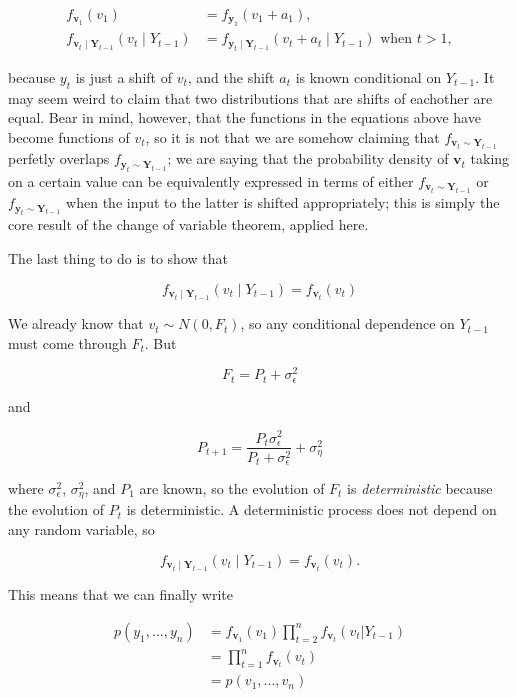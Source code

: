 \documentclass{tufte-book}
\begin{document}
\begin{align*}
f_{\bm{v}_1}(v_1) &= f_{\bm{y}_1} (v_1 + a_1),  \\
f_{\bm{v}_t \mid \bm{Y}_{t-1}}(v_t \mid Y_{t-1}) &= f_{\bm{y}_t \mid \bm{Y}_{t-1}} (v_t + a_t \mid Y_{t-1}) \text{ when } t>1,
\end{align*}

\noindent because $y_t$ is just a shift of $v_t$, and the shift $a_t$ is known conditional on $Y_{t-1}$. It may seem weird to claim that two distributions that are shifts of eachother are equal. Bear in mind, however, that the functions in the equations above have become functions of $v_t$, so it is not that we are somehow claiming that $f_{\bm{v}_t \sim \bm{Y}_{t-1}}$ perfetly overlaps $f_{\bm{y}_t \sim \bm{Y}_{t-1}}$; we are saying that the probability density of $\bm{v}_t$ taking on a certain value can be equivalently expressed in terms of either $f_{\bm{v}_t \sim \bm{Y}_{t-1}}$ or $f_{\bm{y}_t \sim \bm{Y}_{t-1}}$ when the input to the latter is shifted appropriately; this is simply the core result of the change of variable theorem, applied here.

The last thing to do is to show that

\[
f_{\bm{v}_t \mid \bm{Y}_{t-1}}(v_t \mid Y_{t-1}) = f_{\bm{v}_t}(v_t)
\]

We already know that $v_t \sim N(0, F_t)$, so any conditional dependence on $Y_{t-1}$ must come through $F_t$. But 

\[
F_t = P_t + \sigma_\epsilon^2
\]

\noindent and 

\[
P_{t+1} = \frac{P_t \sigma_\epsilon^2}{P_t + \sigma_\epsilon^2} + \sigma_\eta^2
\]

\noindent where $\sigma_\epsilon^2$, $\sigma_\eta^2$, and $P_1$ are known, so the evolution of $F_t$ is \textit{deterministic} because the evolution of $P_t$ is deterministic. A deterministic process does not depend on any random variable, so

\[
f_{\bm{v}_t \mid \bm{Y}_{t-1}}(v_t \mid Y_{t-1}) = f_{\bm{v}_t}(v_t).
\]

\noindent This means that we can finally write

\begin{align*}
p(y_1, ..., y_n) &= f_{\bm{v}_1}(v_1) \prod_{t=2}^n f_{\bm{v}_t} (v_t| Y_{t-1}) \\
&= \prod_{t=1}^n f_{\bm{v}_t} (v_t) \\
&= p(v_1, ..., v_n)
\end{align*}
\end{document}
